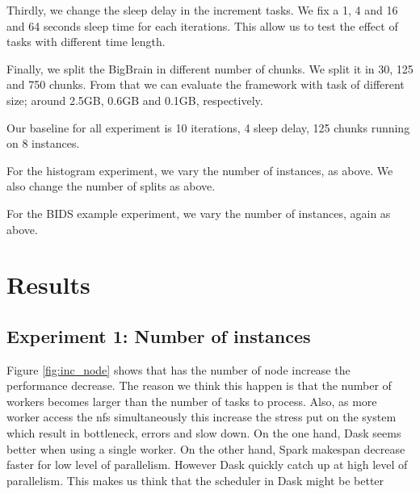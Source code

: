 \documentclass[11pt,a4paper]{article}
\begin{document}
Thirdly, we change the sleep delay in the increment tasks. We fix a 1, 4 and 16 and
64 seconds sleep time for each iterations. This allow us to test the effect of tasks
with different time length.

Finally, we split the BigBrain in different number of chunks. We split it in 30, 125
and 750 chunks. From that we can evaluate the framework with task of different size;
around 2.5GB, 0.6GB and 0.1GB, respectively.

Our baseline for all experiment is 10 iterations, 4 sleep delay, 125 chunks running
on 8 instances.

For the histogram experiment, we vary the number of instances, as above. We also
change the number of splits as above.

For the BIDS example experiment, we vary the number of instances, again as above.



\section{Results}

\subsection{Experiment 1: Number of instances}
Figure \ref{fig:inc_node} shows that has the number of node increase the performance
decrease. The reason we think this happen is that the number of workers becomes
larger than the number of tasks to process. Also, as more worker access the nfs
simultaneously this increase the stress put on the system which result in bottleneck,
errors and slow down. On the one hand, Dask seems better when using a single worker.
On the other hand, Spark makespan decrease faster for low level of parallelism.
However Dask quickly catch up at high level of parallelism. This makes us think that
the scheduler in Dask might be better
\end{document}
